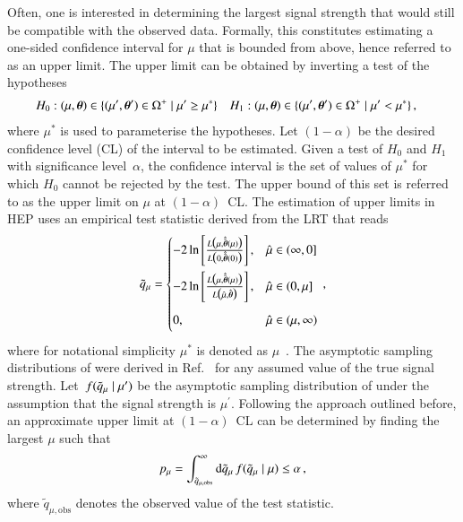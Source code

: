 Often, one is interested in determining the largest signal strength that would
still be compatible with the observed data. Formally, this constitutes
estimating a one-sided confidence interval for $\mu$ that is bounded from above,
hence referred to as an upper limit. The upper limit can be obtained by
inverting a test of the hypotheses
\begin{align*}
  &H_0: (\mu, \myvec{\theta}) \in \{ (\mu^\prime, \myvec{\theta}^\prime) \in \Omega^+ \mid \mu^\prime \geq \mu^* \}
  &&H_1: (\mu, \myvec{\theta}) \in \{ (\mu^\prime, \myvec{\theta}^\prime) \in \Omega^+ \mid \mu^\prime < \mu^* \} \,\text{,}
\end{align*}
where $\mu^*$ is used to parameterise the hypotheses. Let $(1 - \alpha)$ be the
desired confidence level (CL) of the interval to be estimated. Given a test of
$H_0$ and $H_1$ with significance level~$\alpha$, the confidence interval is the
set of values of $\mu^*$ for which $H_0$ cannot be rejected by the test. The
upper bound of this set is referred to as the upper limit on $\mu$ at
$(1 - \alpha)$~CL. The estimation of upper limits in HEP uses an empirical test
statistic derived from the LRT that reads
\begin{align*}
  \qmutilde =
  \begin{cases}
    -2\ln\left[ \frac{ L\bigl( \mu, \hat{\hat{\myvec{\theta}}}(\mu) \bigr)}{L\bigl( 0, \hat{\hat{\myvec{\theta}}}(0) \bigr)} \right], & \muhat \in (\infty, 0] \\[1em]
    -2\ln\left[ \frac{ L\bigl( \mu, \hat{\hat{\myvec{\theta}}}(\mu) \bigr)}{L\bigl( \muhat, \hat{\myvec{\theta}} \bigr)} \right], & \muhat \in (0, \mu] \\[1em]
    0,\phantom{ \biggl[  \biggr]} & \muhat \in (\mu, \infty) \\
  \end{cases} \,\text{,}
\end{align*}
where for notational simplicity $\mu^*$ is denoted as
$\mu$~\cite{Cowan:2010js}. The asymptotic sampling distributions of \qmutilde
were derived in Ref.~\cite{Cowan:2010js} for any assumed value of the true
signal strength. Let~$f(\tilde{q}_{\mu} \mid \mu^\prime)$ be the asymptotic sampling
distribution of \qmutilde under the assumption that the signal strength is
$\mu^\prime$. Following the approach outlined before, an approximate upper limit
at $(1 - \alpha)$~CL can be determined by finding the largest $\mu$ such that
\begin{align*}
  p_\mu = \int_{\tilde{q}_{\mu, \text{obs}}}^{\infty} \mathrm{d}\tilde{q}_{\mu} \, f(\tilde{q}_{\mu} \mid \mu) \leq \alpha \,\text{,}
\end{align*}
where $\tilde{q}_{\mu, \text{obs}}$ denotes the observed value of the test
statistic.

